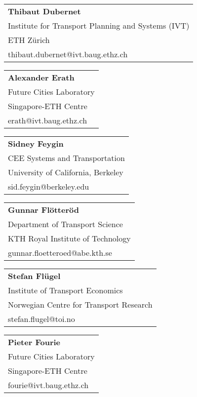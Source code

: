 \begin{tabular}[width=0.48\textwidth]{@{}l}
\textbf{Thibaut Dubernet} \\
Institute for Transport Planning and Systems (IVT) \\
ETH Zürich \\
thibaut.dubernet@ivt.baug.ethz.ch \\
\end{tabular}

\begin{tabular}[width=0.48\textwidth]{@{}l}
\textbf{Alexander Erath} \\
Future Cities Laboratory \\
Singapore-ETH Centre\\
erath@ivt.baug.ethz.ch \\
\end{tabular}

\begin{tabular}[width=0.48\textwidth]{@{}l}
\textbf{Sidney Feygin} \\
CEE Systems and Transportation \\
University of California, Berkeley \\
sid.feygin@berkeley.edu \\
\end{tabular}

\begin{tabular}[width=0.48\textwidth]{@{}l}
\textbf{Gunnar Flötteröd} \\
Department of Transport Science \\
KTH Royal Institute of Technology \\
gunnar.floetteroed@abe.kth.se \\
\end{tabular}

\begin{tabular}[width=0.48\textwidth]{@{}l}
\textbf{Stefan Flügel} \\
Institute of Transport Economics \\
Norwegian Centre for Transport Research \\
stefan.flugel@toi.no \\
\end{tabular}

\begin{tabular}[width=0.48\textwidth]{@{}l}
\textbf{Pieter Fourie} \\
Future Cities Laboratory \\
Singapore-ETH Centre\\
fourie@ivt.baug.ethz.ch \\
\end{tabular}


